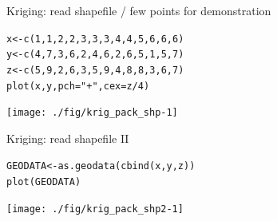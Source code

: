\documentclass[xcolor=table,           xcolor=dvipsnames]{beamer}\usepackage[]{graphicx}\usepackage[]{color}
\makeatletter
\newcommand{\hlnum}[1]{\textcolor[rgb]{0,0,0}{#1}}
\newcommand{\hlstr}[1]{\textcolor[rgb]{0.545,0.137,0.137}{#1}}
\newcommand{\hlopt}[1]{\textcolor[rgb]{0,0,0}{#1}}
\newcommand{\hlstd}[1]{\textcolor[rgb]{0,0,0}{#1}}
\newcommand{\hlkwb}[1]{\textcolor[rgb]{0,0,0}{#1}}
\newcommand{\hlkwc}[1]{\textcolor[rgb]{1,0,1}{#1}}
\newcommand{\hlkwd}[1]{\textcolor[rgb]{0,0,1}{#1}}
\newenvironment{kframe}{%
 \def\at@end@of@kframe{}%
 \ifinner\ifhmode%
  \def\at@end@of@kframe{\end{minipage}}%
  \begin{minipage}{\columnwidth}%
 \fi\fi%
 \def\FrameCommand##1{\hskip\@totalleftmargin \hskip-\fboxsep
 \colorbox{shadecolor}{##1}\hskip-\fboxsep
     \hskip-\linewidth \hskip-\@totalleftmargin \hskip\columnwidth}%
 \MakeFramed {\advance\hsize-\width
   \@totalleftmargin\z@ \linewidth\hsize
   \@setminipage}}%
 {\par\unskip\endMakeFramed%
 \at@end@of@kframe}
\newenvironment{knitrout}{}{} %
\makeatother
\begin{document}
\begin{frame}[fragile]{Kriging: read shapefile / few points for demonstration}
\begin{knitrout}
\color{fgcolor}\begin{kframe}
\begin{alltt}
\hlstd{x} \hlkwb{<-} \hlkwd{c}\hlstd{(}\hlnum{1}\hlstd{,}\hlnum{1}\hlstd{,}\hlnum{2}\hlstd{,}\hlnum{2}\hlstd{,}\hlnum{3}\hlstd{,}\hlnum{3}\hlstd{,}\hlnum{3}\hlstd{,}\hlnum{4}\hlstd{,}\hlnum{4}\hlstd{,}\hlnum{5}\hlstd{,}\hlnum{6}\hlstd{,}\hlnum{6}\hlstd{,}\hlnum{6}\hlstd{)}
\hlstd{y} \hlkwb{<-} \hlkwd{c}\hlstd{(}\hlnum{4}\hlstd{,}\hlnum{7}\hlstd{,}\hlnum{3}\hlstd{,}\hlnum{6}\hlstd{,}\hlnum{2}\hlstd{,}\hlnum{4}\hlstd{,}\hlnum{6}\hlstd{,}\hlnum{2}\hlstd{,}\hlnum{6}\hlstd{,}\hlnum{5}\hlstd{,}\hlnum{1}\hlstd{,}\hlnum{5}\hlstd{,}\hlnum{7}\hlstd{)}
\hlstd{z} \hlkwb{<-} \hlkwd{c}\hlstd{(}\hlnum{5}\hlstd{,}\hlnum{9}\hlstd{,}\hlnum{2}\hlstd{,}\hlnum{6}\hlstd{,}\hlnum{3}\hlstd{,}\hlnum{5}\hlstd{,}\hlnum{9}\hlstd{,}\hlnum{4}\hlstd{,}\hlnum{8}\hlstd{,}\hlnum{8}\hlstd{,}\hlnum{3}\hlstd{,}\hlnum{6}\hlstd{,}\hlnum{7}\hlstd{)}
\hlkwd{plot}\hlstd{(x,y,} \hlkwc{pch}\hlstd{=}\hlstr{"+"}\hlstd{,} \hlkwc{cex}\hlstd{=z}\hlopt{/}\hlnum{4}\hlstd{)}
\end{alltt}
\end{kframe}

{\centering \texttt{[image: ./fig/krig\_pack\_shp-1]} 

}



\end{knitrout}
\vspace{-2em}
\end{frame}


\begin{frame}[fragile]{Kriging: read shapefile II}
\begin{knitrout}
\color{fgcolor}\begin{kframe}
\begin{alltt}
\hlstd{GEODATA} \hlkwb{<-} \hlkwd{as.geodata}\hlstd{(}\hlkwd{cbind}\hlstd{(x,y,z))}
\hlkwd{plot}\hlstd{(GEODATA)}
\end{alltt}
\end{kframe}

{\centering \texttt{[image: ./fig/krig\_pack\_shp2-1]} 

}



\end{knitrout}
\end{frame}
\end{document}
